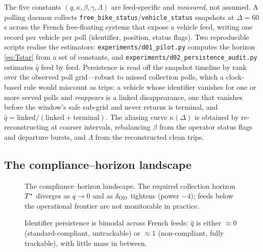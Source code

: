 The five constants $(q,\kappa,\beta,\gamma,\Lambda)$ are feed-specific and
\emph{measured}, not assumed. A polling daemon collects
\texttt{free\_bike\_status}/\texttt{vehicle\_status} snapshots at
$\Delta=60$\,s across the French free-floating systems that expose a vehicle
feed, writing one record per vehicle per poll (identifier, position, status
flags). Two reproducible scripts realise the estimators:
\texttt{experiments/d01\_pilot.py} computes the horizon \eqref{eq:Tstar} from a
set of constants, and \texttt{experiments/d02\_persistence\_audit.py} estimates
$\hat q$ feed by feed. Persistence is read off the snapshot timeline by rank over
the observed poll grid---robust to missed collection polls, which a clock-based
rule would miscount as trips: a vehicle whose identifier vanishes for one or more
served polls and \emph{reappears} is a linked disappearance, one that vanishes
before the window's safe sub-grid and never returns is terminal, and
$\hat q = \text{linked}/(\text{linked}+\text{terminal})$. The aliasing curve
$\kappa(\Delta)$ is obtained by re-reconstructing at coarser intervals,
rebalancing $\beta$ from the operator status flags and departure bursts, and
$\Lambda$ from the reconstructed clean trips. 

\subsection{The compliance--horizon landscape}
\label{sec:landscape}

\begin{figure}[t]
  \centering
  \caption{The compliance--horizon landscape. The required collection horizon
  $T^{\star}$ diverges as $q\to 0$ and as $\delta_{\mathrm{OD}}$ tightens (power $-4$);
  feeds below the operational frontier are not monitorable in practice.
  }
  \label{fig:horizon}
\end{figure}

\begin{figure}[t]
  \centering
  \caption{Identifier persistence is bimodal across French feeds: $\hat q$ is
  either $\approx 0$ (standard-compliant, untrackable) or $\approx 1$
  (non-compliant, fully trackable), with little mass in between.}
  \label{fig:persistence}
\end{figure}

